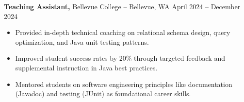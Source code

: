 \documentclass[11pt]{article}       %
\begin{document}
\textbf{Teaching Assistant,} {Bellevue College} -- Bellevue, WA \hfill April 2024 -- December 2024 \\
\vspace{-9pt}
\begin{itemize}
  \item Provided in-depth technical coaching on relational schema design, query optimization, and Java unit testing patterns.
  \item Improved student success rates by 20\% through targeted feedback and supplemental instruction in Java best practices.
  \item Mentored students on software engineering principles like documentation (Javadoc) and testing (JUnit) as foundational career skills.
\end{itemize}

\end{document}
